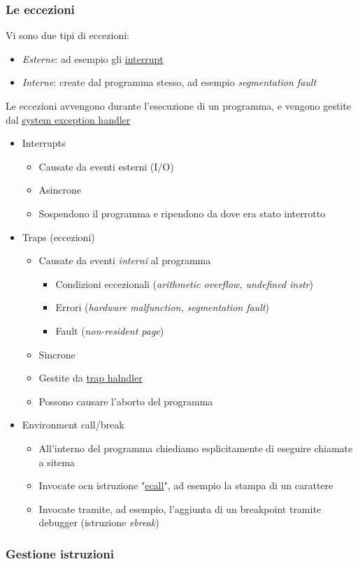 \subsubsection*{Le eccezioni}
Vi sono due tipi di eccezioni:
\begin{itemize}
  \item \textit{Esterne}: ad esempio gli \underline{interrupt}
  \item \textit{Interne}: create dal programma stesso, ad esempio \textit{segmentation fault}
\end{itemize}
Le eccezioni avvengono durante l'esecuzione di un programma, e vengono gestite dal \underline{system exception handler}
\begin{itemize}
  \item Interrupts
    \begin{itemize}
      \item Causate da eventi esterni (I/O)
      \item Asincrone
      \item Sospendono il programma e ripendono da dove era stato interrotto
    \end{itemize}
  \item Traps (eccezioni)
    \begin{itemize}
      \item Causate da eventi \textit{interni} al programma 
        \begin{itemize}
          \item Condizioni eccezionali (\textit{arithmetic overflow, undefined instr})
          \item Errori (\textit{hardware malfunction, segmentation fault})
          \item Fault (\textit{non-resident page})
        \end{itemize}
      \item Sincrone
      \item Gestite da \underline{trap halndler}
      \item Possono causare l'aborto del programma
    \end{itemize}
  \item Environment call/break
    \begin{itemize}
      \item All'interno del programma chiediamo esplicitamente di eseguire chiamate a sitema
      \item Invocate ocn istruzione "\underline{ecall}", ad esempio la stampa di un carattere
      \item Invocate tramite, ad esempio, l'aggiunta di un breakpoint tramite debugger (istruzione \textit{ebreak})
    \end{itemize}
\end{itemize}
\subsubsection*{Gestione istruzioni}


